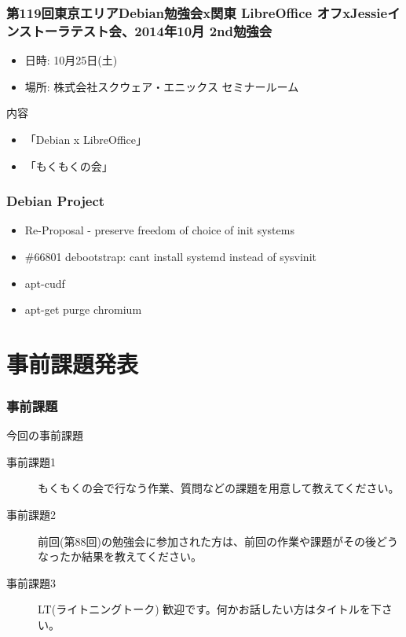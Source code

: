 \documentclass[cjk,dvipdfmx,10pt,compress,%
hyperref={bookmarks=true,bookmarksnumbered=true,bookmarksopen=false,%
colorlinks=false,%
pdftitle={第 89 回 関西 Debian 勉強会},%
pdfauthor={倉敷・のがた・佐々木・かわだ・八津尾},%
pdfsubject={資料},%
}]{beamer}
\begin{document}
\begin{frame}[fragile]
  \frametitle{第119回東京エリアDebian勉強会x関東 LibreOffice オフxJessieインストーラテスト会、2014年10月 2nd勉強会}
  \begin{itemize}
  \item 日時: 10月25日(土)
  \item 場所: 株式会社スクウェア・エニックス セミナールーム
  \end{itemize}
  \begin{block}{内容}
    \begin{itemize}
    \item 「Debian x LibreOffice」
    \item 「もくもくの会」
    \end{itemize}
  \end{block}
\end{frame}

\begin{frame}[fragile]
  \frametitle{Debian Project}
  \begin{itemize}
  \item Re-Proposal - preserve freedom of choice of init systems
  \item \#66801 debootstrap: cant install systemd instead of sysvinit
  \item apt-cudf
  \item apt-get purge chromium
  \end{itemize}
\end{frame}


\section{事前課題発表}


\begin{frame}[fragile]
  \frametitle{事前課題}
  \begin{block}{今回の事前課題}
    \begin{description}
    \item[事前課題1]
      もくもくの会で行なう作業、質問などの課題を用意して教えてください。
    \item[事前課題2]
      前回(第88回)の勉強会に参加された方は、前回の作業や課題がその後どう
      なったか結果を教えてください。
    \item[事前課題3]
      LT(ライトニングトーク) 歓迎です。何かお話したい方はタイトルを下さい。
    \end{description}
  \end{block}
\end{frame}
\end{document}
